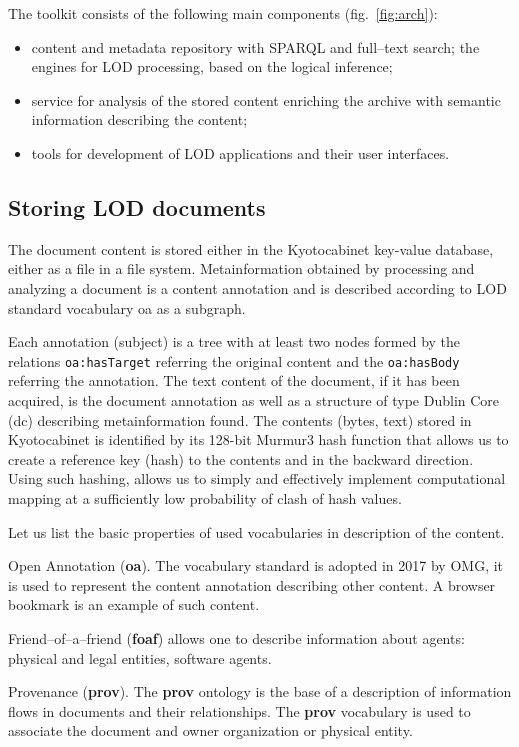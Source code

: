 \documentclass[conference,a4paper]{IEEEtran}
\begin{document}
The toolkit consists of the following main components (fig.~\ref{fig:arch}):
\begin{itemize}
\item content and metadata repository with SPARQL and full--text search; the engines for LOD processing, based on the logical inference;
\item service for analysis of the stored content enriching the archive with semantic information describing the content;
\item tools for development of LOD applications and their user interfaces.
\end{itemize}

\subsection{Storing LOD documents}

The document content is stored either in the Kyotocabinet key-value database, either as a file in a file system.  Metainformation obtained by processing and analyzing a document is a content annotation and is described according to LOD standard vocabulary oa as a subgraph.

Each annotation (subject) is a tree with at least two nodes formed by the relations \texttt{oa:hasTarget} referring the original content and the \texttt{oa:hasBody} referring the annotation.  The text content of the document, if it has been acquired, is the document annotation as well as a structure of type Dublin Core (dc) describing metainformation found.  The contents (bytes, text) stored in Kyotocabinet is identified by its 128-bit Murmur3 hash function that allows us to create a reference key (hash) to the contents and in the backward direction.  Using such hashing, allows us to simply and effectively implement computational mapping at a sufficiently low probability of clash of hash values.

Let us list the basic properties of used vocabularies in description of the content.

Open Annotation (\textbf{oa}). The vocabulary standard is adopted in 2017 by OMG, it is used to represent the content annotation describing other content.  A browser bookmark is an example of such content.

Friend--of--a--friend (\textbf{foaf}) allows one to describe information about agents: physical and legal entities, software agents.

Provenance (\textbf{prov}).  The \textbf{prov} ontology is the base of a description of information flows in documents and their relationships. The \textbf{prov} vocabulary is used to associate the document and owner organization or physical entity.
\end{document}
